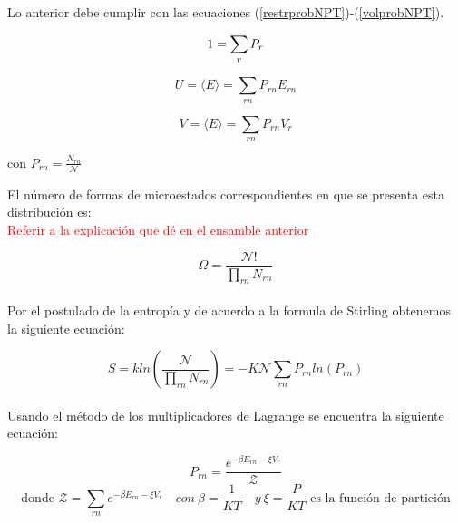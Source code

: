 Lo anterior debe cumplir con las ecuaciones (\ref{restrprobNPT})-(\ref{volprobNPT}).

\begin{equation} \label{restrprobNPT}
    1 = \sum_r P_r \\
\end{equation}

\begin{equation} \label{energiaprobNPT}
    U = \langle E\rangle = \sum_{rn} P_{rn} E_{rn}
\end{equation}

\begin{equation} \label{volprobNPT}
    V = \langle E\rangle = \sum_{rn} P_{rn} V_r
\end{equation}

\begin{center}
    con $P_{rn} = \frac{N_{rn}}{\mathcal{N}}$
\end{center}

El número de formas de microestados correspondientes en que se presenta esta distribución es:\\ \textcolor{red}{Referir a la explicación que dé en el ensamble anterior}

\begin{equation} \label{distribucionmultnom}
    \Omega = \frac{\mathcal{N}!}{\prod_{rn} N_{rn}}
\end{equation}\\

Por el postulado de la entropía y de acuerdo a la formula de Stirling obtenemos la siguiente ecuación:

\begin{equation}  \label{entropiaboltzNPT}
    S = kln(\frac{\mathcal{N}}{\prod_{rn} N_{rn}}) = -K\mathcal{N}\sum_{rn} P_{rn} ln(P_{rn})
\end{equation}\\

Usando el método de los multiplicadores de Lagrange se encuentra la siguiente ecuación:

\begin{equation} \label{probNPT}
    P_{rn} = \frac{e^{-\beta E_{rn}-\xi V_r}}{\mathcal{Z}}
\end{equation}
\begin{equation*} \label{funcpartNPT}
    \text{donde }\mathcal{Z} = \sum_{rn} e^{-\beta E_{rn}-\xi V_r} \quad con\ \beta=\frac{1}{KT} \quad y\ \xi=\frac{P}{KT}\text{ es la función de partición}
\end{equation*}

